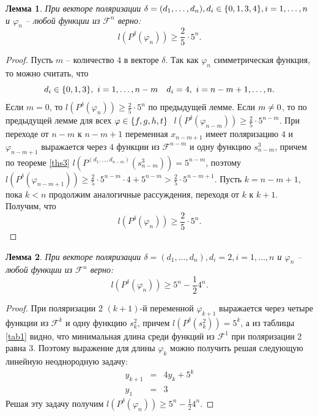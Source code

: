 \documentclass[bibliography=totoc, a4paper, 14pt]{extarticle}
\newtheorem{mylm}{Лемма}
\newcommand{\pphi}[1] {P^{\delta}(\varphi_{#1})}
\def\neq{\not=\nobreak\discretionary{}{\usefont{OMS}{cmsy}{m}{n}\char54\usefont{OT1}{cmr}{m}{n}\char61}{}}
\def\in{\mathchar"3232\nobreak\discretionary{}{\usefont{OMS}{cmsy}{m}{n}\char50}{}}
\begin{document}
\begin{mylm}
При векторе поляризации $\delta = (d_1,\dots,d_n), d_i \in \{0,1,3,4\}, i = 1,\dots,n$ и
$\varphi_n$ -- любой функции из $\mathcal{F}^n$ верно:
$$l(\pphi{n}) \geqslant \frac{2}{5} \cdot 5^n.$$
\end{mylm}
\begin{proof}
Пусть $m$ -- количество $4$ в векторе $\delta$.
Так как $\varphi_n$ симметрическая функция, то можно считать, что
$$d_i \in \{0,1,3\},\ i=1,\dots,n-m \quad d_i = 4,\ i=n-m+1,\dots,n.$$
Если $m=0$, то $l(\pphi{n}) \geqslant \frac{2}{5} \cdot 5^n$ по предыдущей лемме.
Если $m \neq 0$, то по предыдущей лемме для всех $\varphi \in \{f,g,h,t\}\ $
$l(\pphi{n-m}) \geqslant \frac{2}{5} \cdot 5^{n-m}$. При переходе от ${n-m}$ к ${n-m+1}$ переменная
$x_{n-m+1}$ имеет поляризацию $4$ и $\varphi_{n-m+1}$ выражается через $4$ функции из
$\mathcal{F}^{n-m}$ и одну функцию $s^3_{n-m}$, причем по теореме \ref{ths3}
$l(P^{(d_1,\dots,d_{n-m})}(s^3_{n-m})) = 5^{n-m}$, поэтому
$l(\pphi{n-m+1}) \geqslant \frac{2}{5}\cdot5^{n-m}\cdot4+5^{n-m}>\frac{2}{5}\cdot5^{n-m+1}$. Пусть
$k=n-m+1$, пока $k<n$ продолжим аналогичные рассуждения, переходя от $k$ к $k+1$. Получим, что
$$l(\pphi{n}) \geqslant \frac{2}{5} \cdot 5^n.$$
\end{proof}

\begin{mylm}
\label{lm2l}
При векторе поляризации $\delta = (d_1,\dots,d_n), d_i = 2, i = 1,\dots,n$ и
$\varphi_n$ -- любой функции из $\mathcal{F}^n$ верно:
$$l(\pphi{n}) \geqslant 5^n - \frac{1}{2}4^n.$$
\end{mylm}
\begin{proof}
При поляризации 2 $(k+1)$-й переменной $\varphi_{k+1}$ выражается через четыре функции из
$\mathcal{F}^k$ и одну функцию $s^2_k$, причем $l(P^{\delta}(s^2_k)) = 5^k$, а из таблицы
\ref{tab1} видно, что минимальная длина среди функций из $\mathcal{F}^1$ при поляризации 2
равна 3. Поэтому выражение для длины $\varphi_k$ можно получить решая следующую линейную
неоднородную задачу:
$$ \begin{array}{lcl}
y_{k+1} &=& 4 y_k + 5^k \\
y_1     &=& 3
\end{array} $$
Решая эту задачу получим $l(\pphi{n}) \geqslant 5^n - \frac{1}{2}4^n$.
\end{proof}
\end{document}

